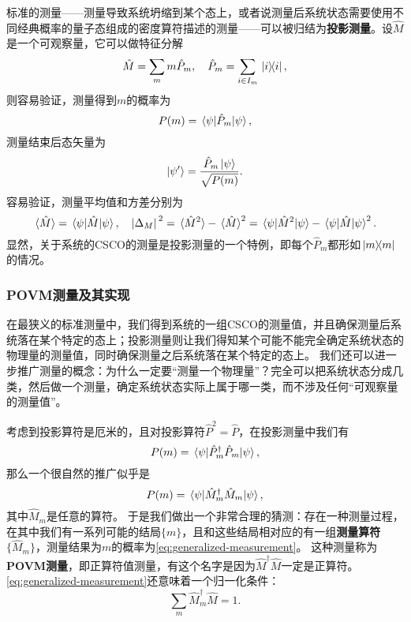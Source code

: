 \documentclass[UTF8, a4paper]{ctexart}
\begin{document}
标准的测量——测量导致系统坍缩到某个态上，或者说测量后系统状态需要使用不同经典概率的量子态组成的密度算符描述的测量——可以被归结为\textbf{投影测量}。设$\hat{M}$是一个可观察量，它可以做特征分解
\begin{equation}
    \hat{M} = \sum_m m \hat{P}_m, \quad \hat{P}_m = \sum_{i \in I_m} \dyad*{i}{i},
\end{equation}
则容易验证，测量得到$m$的概率为
\begin{equation}
    P(m) = \mel*{\psi}{\hat{P}_m}{\psi},
\end{equation}
测量结束后态矢量为
\begin{equation}
    \ket{\psi'} = \frac{\hat{P}_m \ket{\psi}}{\sqrt{P(m)}}.
\end{equation}
容易验证，测量平均值和方差分别为
\begin{equation}
    \expval*{\hat{M}} = \mel*{\psi}{\hat{M}}{\psi}, \quad \abs*{\Delta_M}^2 = \expval*{\hat{M}^2} - \expval*{\hat{M}}^2 = \mel*{\psi}{\hat{M}^2}{\psi} - \mel*{\psi}{\hat{M}}{\psi}^2.
\end{equation}
显然，关于系统的CSCO的测量是投影测量的一个特例，即每个$\hat{P}_m$都形如$\dyad*{m}{m}$的情况。

\subsubsection{POVM测量及其实现}

在最狭义的标准测量中，我们得到系统的一组CSCO的测量值，并且确保测量后系统落在某个特定的态上；投影测量则让我们得知某个可能不能完全确定系统状态的物理量的测量值，同时确保测量之后系统落在某个特定的态上。
我们还可以进一步推广测量的概念：为什么一定要“测量一个物理量”？完全可以把系统状态分成几类，然后做一个测量，确定系统状态实际上属于哪一类，而不涉及任何“可观察量的测量值”。

考虑到投影算符是厄米的，且对投影算符$\hat{P}^2 = \hat{P}$，在投影测量中我们有
\[
    P(m) = \mel*{\psi}{\hat{P}_m^\dagger \hat{P}_m}{\psi},
\]
那么一个很自然的推广似乎是
\begin{equation}
    P(m) = \mel*{\psi}{\hat{M}_m^\dagger \hat{M}_m}{\psi},
    \label{eq:generalized-measurement}
\end{equation}
其中$\hat{M}_m$是任意的算符。
于是我们做出一个非常合理的猜测：存在一种测量过程，在其中我们有一系列可能的结局$\{m\}$，且和这些结局相对应的有一组\textbf{测量算符}$\{\hat{M}_m\}$，测量结果为$m$的概率为\eqref{eq:generalized-measurement}。
这种测量称为\textbf{POVM测量}，即正算符值测量，有这个名字是因为$\hat{M}^\dagger \hat{M}$一定是正算符。
\eqref{eq:generalized-measurement}还意味着一个归一化条件：
\begin{equation}
    \sum_m \hat{M}^\dagger_m \hat{M} = 1.
\end{equation}
\end{document}
